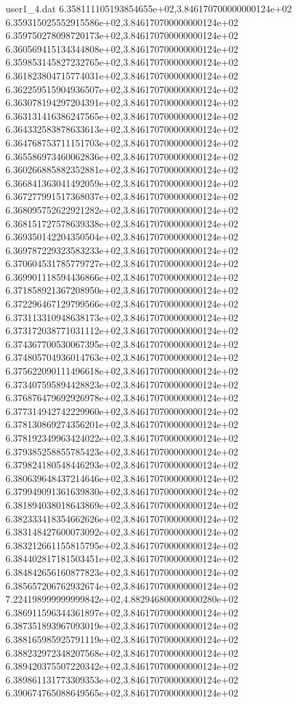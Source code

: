 \begin{filecontents}{user1_4.dat}
6.358111105193854655e+02,3.846170700000000124e+02
6.359315025552915586e+02,3.846170700000000124e+02
6.359750278098720173e+02,3.846170700000000124e+02
6.360569415134344808e+02,3.846170700000000124e+02
6.359853145827232765e+02,3.846170700000000124e+02
6.361823804715774031e+02,3.846170700000000124e+02
6.362259515904936507e+02,3.846170700000000124e+02
6.363078194297204391e+02,3.846170700000000124e+02
6.363131416386247565e+02,3.846170700000000124e+02
6.364332583878633613e+02,3.846170700000000124e+02
6.364768753711151703e+02,3.846170700000000124e+02
6.365586973460062836e+02,3.846170700000000124e+02
6.360266885882352881e+02,3.846170700000000124e+02
6.366841363041492059e+02,3.846170700000000124e+02
6.367277991517368037e+02,3.846170700000000124e+02
6.368095752622921282e+02,3.846170700000000124e+02
6.368151727578639338e+02,3.846170700000000124e+02
6.369350142204350504e+02,3.846170700000000124e+02
6.369787229323583233e+02,3.846170700000000124e+02
6.370604531785779727e+02,3.846170700000000124e+02
6.369901118594436866e+02,3.846170700000000124e+02
6.371858921367208950e+02,3.846170700000000124e+02
6.372296467129799566e+02,3.846170700000000124e+02
6.373113310948638173e+02,3.846170700000000124e+02
6.373172038771031112e+02,3.846170700000000124e+02
6.374367700530067395e+02,3.846170700000000124e+02
6.374805704936014763e+02,3.846170700000000124e+02
6.375622090111496618e+02,3.846170700000000124e+02
6.373407595894428823e+02,3.846170700000000124e+02
6.376876479692926978e+02,3.846170700000000124e+02
6.377314942742229960e+02,3.846170700000000124e+02
6.378130869274356201e+02,3.846170700000000124e+02
6.378192349963424022e+02,3.846170700000000124e+02
6.379385258855785423e+02,3.846170700000000124e+02
6.379824180548446293e+02,3.846170700000000124e+02
6.380639648437214646e+02,3.846170700000000124e+02
6.379949091361639830e+02,3.846170700000000124e+02
6.381894038018643869e+02,3.846170700000000124e+02
6.382333418354662626e+02,3.846170700000000124e+02
6.383148427600073092e+02,3.846170700000000124e+02
6.383212661155815795e+02,3.846170700000000124e+02
6.384402817181503451e+02,3.846170700000000124e+02
6.384842656160877823e+02,3.846170700000000124e+02
6.385657206762932674e+02,3.846170700000000124e+02
7.224198999999999842e+02,4.882946800000000280e+02
6.386911596344361897e+02,3.846170700000000124e+02
6.387351893967093019e+02,3.846170700000000124e+02
6.388165985925791119e+02,3.846170700000000124e+02
6.388232972348207568e+02,3.846170700000000124e+02
6.389420375507220342e+02,3.846170700000000124e+02
6.389861131773309353e+02,3.846170700000000124e+02
6.390674765088649565e+02,3.846170700000000124e+02

\end{filecontents}
